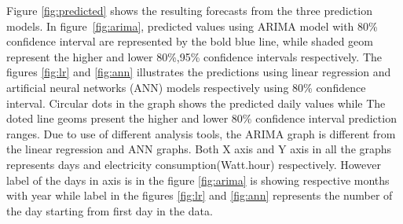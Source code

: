 Figure \ref{fig:predicted} shows the resulting forecasts from the three prediction models. In figure~\ref{fig:arima}, predicted values using ARIMA model with 80\% confidence interval  are represented by the bold blue line, while shaded geom represent the higher and lower 80\%,95\% confidence intervals respectively. The figures \ref{fig:lr} and \ref{fig:ann} illustrates the predictions using linear regression and artificial neural networks (ANN) models respectively using 80\% confidence interval. Circular dots in the graph shows the predicted daily values while The doted line geoms present the higher and lower 80\% confidence interval prediction ranges. Due to use of different analysis tools, the ARIMA graph is different from the linear regression and ANN graphs. Both X axis and Y axis in all the graphs represents days and electricity consumption(Watt.hour) respectively. However label of the days in axis is in the figure \ref{fig:arima} is showing respective months with year while label in the figures \ref{fig:lr} and \ref{fig:ann} represents the number of the day starting from first day in the data.  
 \\
